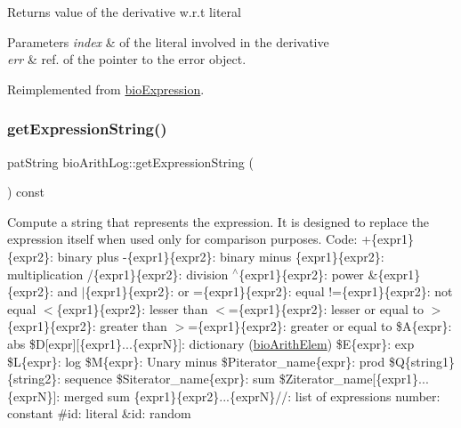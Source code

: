 \begin{DoxyReturn}{Returns}
value of the derivative w.\+r.\+t literal 
\end{DoxyReturn}

\begin{DoxyParams}{Parameters}
{\em index} & of the literal involved in the derivative \\
\hline
{\em err} & ref. of the pointer to the error object. \\
\hline
\end{DoxyParams}


Reimplemented from \hyperlink{classbio_expression_a5915579d1193f25f216c1e273c97f2ce}{bio\+Expression}.

\mbox{\label{classbio_arith_log_a5deea723cf9e2b50dc4f6c61a6b82090}} 
\subsubsection{\texorpdfstring{get\+Expression\+String()}{getExpressionString()}}
{\footnotesize\ttfamily pat\+String bio\+Arith\+Log\+::get\+Expression\+String (\begin{DoxyParamCaption}{ }\end{DoxyParamCaption}) const\hspace{0.3cm}{\ttfamily [virtual]}}

Compute a string that represents the expression. It is designed to replace the expression itself when used only for comparison purposes. Code\+: +\{expr1\}\{expr2\}\+: binary plus -\/\{expr1\}\{expr2\}\+: binary minus \{expr1\}\{expr2\}\+: multiplication /\{expr1\}\{expr2\}\+: division $^\wedge$\{expr1\}\{expr2\}\+: power \&\{expr1\}\{expr2\}\+: and $\vert$\{expr1\}\{expr2\}\+: or =\{expr1\}\{expr2\}\+: equal !=\{expr1\}\{expr2\}\+: not equal $<$\{expr1\}\{expr2\}\+: lesser than $<$=\{expr1\}\{expr2\}\+: lesser or equal to $>$\{expr1\}\{expr2\}\+: greater than $>$=\{expr1\}\{expr2\}\+: greater or equal to \$A\{expr\}\+: abs \$D\mbox{[}expr\mbox{]}\mbox{[}\{expr1\}...\{exprN\}\mbox{]}\+: dictionary (\hyperlink{classbio_arith_elem}{bio\+Arith\+Elem}) \$E\{expr\}\+: exp \$L\{expr\}\+: log \$M\{expr\}\+: Unary minus \$\+Piterator\+\_\+name\{expr\}\+: prod \$Q\{string1\}\{string2\}\+: sequence \$\+Siterator\+\_\+name\{expr\}\+: sum \$\+Ziterator\+\_\+name\mbox{[}\{expr1\}...\{exprN\}\mbox{]}\+: merged sum \{expr1\}\{expr2\}...\{exprN\}//\+: list of expressions number\+: constant \#id\+: literal \&id\+: random 

